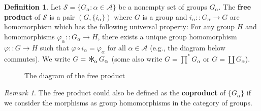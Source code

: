 \documentclass[a4paper,titlepage]{article}
\theoremstyle{remark}
\newtheorem*{remark}{Remark}
\theoremstyle{definition}
\newtheorem{definition}{Definition}
\theoremstyle{theorem}
\DeclareMathOperator*{\freeprod}{\raisebox{-0.4ex}{\scalebox{2}{$\ast$}}\!}
\begin{document}
  \begin{definition}
    Let $\mathcal{S} = \{ G_\alpha : \alpha \in \mathcal{A} \}$ be a nonempty set of groups $G_{\alpha}$.
    The {\bf free product} of $\mathcal{S}$ is a pair $(G, \{i_\alpha\})$ where $G$ is a group
    and $i_{\alpha} :: G_\alpha \to G$ are homomorphism which has the following universal property:
    For any group $H$ and homomorphisms $\varphi_\alpha :: G_\alpha \to H$, 
    there exists a unique group homomorphism $\varphi :: G \to H$ such that $\varphi \circ i_\alpha = \varphi_\alpha$ for
    all $\alpha \in \mathcal{A}$ (e.g., the diagram below commutes).
    We write $G = \freeprod_\alpha G_\alpha$ (some also write
    $G = \prod^* G_\alpha$ or $G = \coprod G_\alpha$).
  \end{definition}

  \begin{figure}[h]
    \centering
    \caption{The diagram of the free product}
  \end{figure}

  \begin{remark}
    The free product could also be defined as the {\bf coproduct} of $\{ G_\alpha \}$ if we consider the morphisms
    as group homomorphisms in the category of groups.
  \end{remark}
\end{document}
